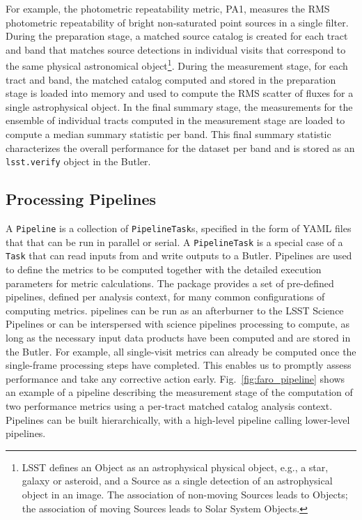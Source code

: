 For example, the photometric repeatability metric, PA1, measures the RMS photometric repeatability of bright non-saturated point sources in a single filter.
During the preparation stage, a matched source catalog is created for each tract and band that matches source detections in individual visits that correspond to the same physical astronomical object\footnote{LSST defines an Object as an astrophysical physical object, e.g., a star, galaxy or asteroid, and a Source as a single detection of an astrophysical object in an image. The association of non-moving Sources leads to Objects; the association of moving Sources leads to Solar System Objects.}.
During the measurement stage, for each tract and band, the matched catalog computed and stored in the preparation stage is loaded into memory and used to compute the RMS scatter of fluxes for a single astrophysical object. 
In the final summary stage, the measurements for the ensemble of individual tracts computed in the measurement stage are loaded to compute a median summary statistic per band. 
This final summary statistic characterizes the overall performance for the dataset per band and is stored as an \texttt{lsst.verify} object in the Butler. 

\subsection{Processing Pipelines} \label{ssec:pipelines}

A \texttt{Pipeline} is a collection of \texttt{PipelineTask}s, specified in the form of YAML files that that can be run in parallel or serial.
A \texttt{PipelineTask} is a special case of a \texttt{Task} that can read inputs from and write outputs to a Butler.
Pipelines are used to define the \faro metrics to be computed together with the detailed execution parameters for metric calculations.
The \faro package provides a set of pre-defined pipelines, defined per analysis context, for many common configurations of computing metrics. 
\faro pipelines can be run as an afterburner to the LSST Science Pipelines or can be interspersed with science pipelines processing to compute, as long as the necessary input data products have been computed and are stored in the Butler.
For example, all single-visit metrics can already be computed once the single-frame processing steps have completed. 
This enables us to promptly assess performance and take any corrective action early. 
Fig.~\ref{fig:faro_pipeline} shows an example of a \faro pipeline describing the measurement stage of the computation of two performance metrics using a per-tract matched catalog analysis context.
Pipelines can be built hierarchically, with a high-level pipeline calling lower-level pipelines.

